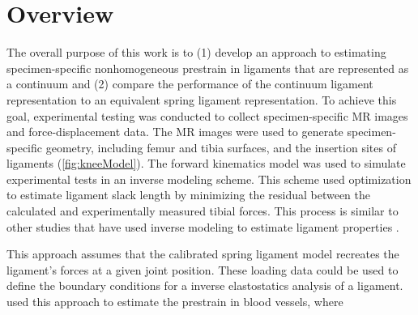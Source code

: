 \section{Overview}
The overall purpose of this work is to (1) develop an approach to estimating specimen-specific nonhomogeneous prestrain in ligaments that are represented as a continuum and (2) compare the performance of the continuum ligament representation to an equivalent spring ligament representation. To achieve this goal, experimental testing was conducted to collect specimen-specific MR images and force-displacement data. The MR images were used to generate specimen-specific geometry, including femur and tibia surfaces, and the insertion sites of ligaments (\autoref{fig:kneeModel}). The forward kinematics model was used to simulate experimental tests in an inverse modeling scheme. This scheme used optimization to estimate ligament slack length by minimizing the residual between the calculated and experimentally measured tibial forces. This process is similar to other studies that have used inverse modeling to estimate ligament properties \citep{blankevoort_validation_1996,baldwin_dynamic_2012,ewing_estimating_2015,harris_combined_2016}.

This approach assumes that the calibrated spring ligament model recreates the ligament's forces at a given joint position. These loading data could be used to define the boundary conditions for a inverse elastostatics analysis of a ligament. \cite{lu_computational_2007} used this approach to estimate the prestrain in blood vessels, where 

